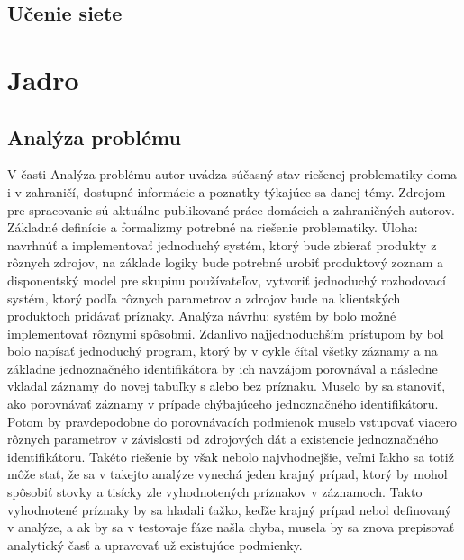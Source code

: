 \subsection{Učenie siete}

\section{Jadro}
\subsection{Analýza problému}
V časti Analýza problému autor uvádza súčasný stav riešenej problematiky doma i v zahraničí, dostupné informácie a poznatky týkajúce sa danej témy. Zdrojom pre spracovanie sú aktuálne publikované práce domácich a zahraničných autorov. Základné definície a formalizmy potrebné na riešenie problematiky.
\newline \newline
Úloha:  navrhnúť a implementovať jednoduchý systém, ktorý bude zbierať produkty z rôznych zdrojov, na základe logiky bude potrebné urobiť produktový zoznam a disponentský model pre skupinu používateľov, vytvoriť jednoduchý rozhodovací systém, ktorý podľa rôznych parametrov a zdrojov bude na klientských produktoch pridávať príznaky.
\newline \newline
Analýza návrhu: systém by bolo možné implementovať rôznymi spôsobmi.
\newline \newline
Zdanlivo najjednoduchším prístupom by bol bolo napísať jednoduchý program, ktorý by v cykle čítal všetky záznamy a na základne jednoznačného identifikátora by ich navzájom porovnával a následne vkladal záznamy do novej tabuľky s alebo bez príznaku. Muselo by sa stanoviť, ako porovnávať záznamy v prípade chýbajúceho jednoznačného identifikátoru. Potom by pravdepodobne do porovnávacích podmienok muselo vstupovať viacero rôznych  parametrov v závislosti od zdrojových dát a existencie jednoznačného identifikátoru.
Takéto riešenie by však nebolo najvhodnejšie, veľmi ľakho sa totiž môže stať, že sa v takejto analýze vynechá jeden krajný prípad, ktorý by mohol spôsobiť stovky a tisícky zle vyhodnotených príznakov v záznamoch. Takto vyhodnotené príznaky by sa hladali ťažko, keďže krajný prípad nebol definovaný v analýze, a ak by sa v testovaje fáze našla chyba, musela by sa znova prepisovať analytický časť a upravovať už existujúce podmienky.
